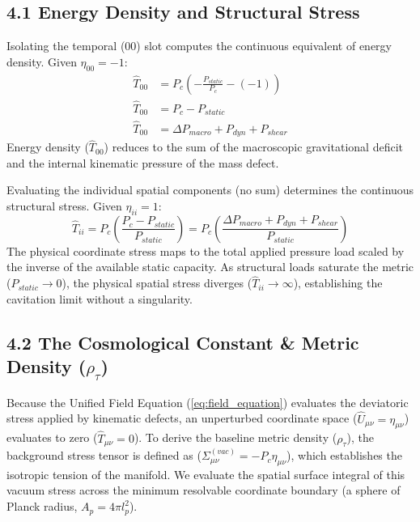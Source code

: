 
\subsection*{4.1 Energy Density and Structural Stress}
Isolating the temporal ($00$) slot computes the continuous equivalent of energy density. Given $\eta_{00} = -1$:
\begin{align}
    \hat{T}_{00} &= P_c \left( -\frac{P_{static}}{P_c} - (-1) \right) \nonumber \\
    \hat{T}_{00} &= P_c - P_{static} \nonumber \\
    \hat{T}_{00} &= \Delta P_{macro} + P_{dyn} + P_{shear} \label{eq:energy_density_proof}
\end{align}
Energy density ($\hat{T}_{00}$) reduces to the sum of the macroscopic gravitational deficit and the internal kinematic pressure of the mass defect. 

Evaluating the individual spatial components (no sum) determines the continuous structural stress. Given $\eta_{ii} = 1$:
\begin{equation}
    \hat{T}_{ii} = P_c \left( \frac{P_c - P_{static}}{P_{static}} \right) = P_c \left( \frac{\Delta P_{macro} + P_{dyn} + P_{shear}}{P_{static}} \right) \label{eq:spatial_stress_proof}
\end{equation}
The physical coordinate stress maps to the total applied pressure load scaled by the inverse of the available static capacity. As structural loads saturate the metric ($P_{static} \to 0$), the physical spatial stress diverges ($\hat{T}_{ii} \to \infty$), establishing the cavitation limit without a singularity.



\subsection*{4.2 The Cosmological Constant \& Metric Density ($\rho_\tau$)}
Because the Unified Field Equation (\ref{eq:field_equation}) evaluates the deviatoric stress applied by kinematic defects, an unperturbed coordinate space ($\hat{U}_{\mu\nu} = \eta_{\mu\nu}$) evaluates to zero ($\hat{T}_{\mu\nu} = 0$). To derive the baseline metric density ($\rho_\tau$), the background stress tensor is defined as ($\Sigma_{\mu\nu}^{(vac)} = -P_c \eta_{\mu\nu}$), which establishes the isotropic tension of the manifold. We evaluate the spatial surface integral of this vacuum stress across the minimum resolvable coordinate boundary (a sphere of Planck radius, $A_p = 4\pi l_p^2$).

